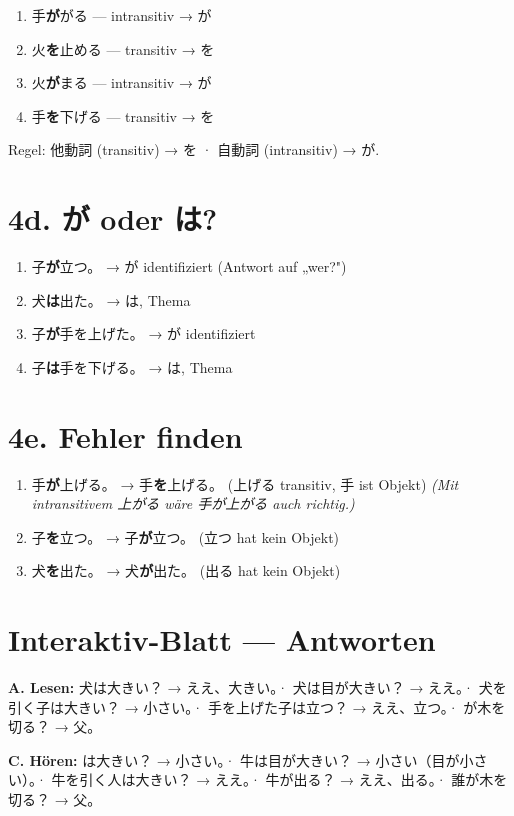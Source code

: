 \documentclass[11pt,a4paper,DIV=12]{scrartcl}
\begin{document}
\begin{enumerate}[itemsep=3pt]
\item 手\textbf{が}がる — intransitiv → が
\item 火\textbf{を}止める — transitiv → を
\item 火\textbf{が}まる — intransitiv → が
\item 手\textbf{を}下げる — transitiv → を
\end{enumerate}

Regel: 他動詞 (transitiv) → を · 自動詞 (intransitiv) → が.

\section{4d. が oder は?}

\begin{enumerate}[itemsep=3pt]
\item 子\textbf{が}立つ。 → が identifiziert (Antwort auf „wer?")
\item 犬\textbf{は}出た。 → は, Thema
\item 子\textbf{が}手を上げた。 → が identifiziert
\item 子\textbf{は}手を下げる。 → は, Thema
\end{enumerate}

\section{4e. Fehler finden}

\begin{enumerate}[itemsep=3pt]
\item 手\textbf{が}上げる。 → 手\textbf{を}上げる。 (上げる transitiv, 手 ist Objekt)
  \emph{(Mit intransitivem 上がる wäre 手が上がる auch richtig.)}
\item 子\textbf{を}立つ。 → 子\textbf{が}立つ。 (立つ hat kein Objekt)
\item 犬\textbf{を}出た。 → 犬\textbf{が}出た。 (出る hat kein Objekt)
\end{enumerate}

\section*{Interaktiv-Blatt — Antworten}

\textbf{A. Lesen:}
犬は大きい？ → ええ、大きい。\quad ·\quad
犬は目が大きい？ → ええ。\quad ·\quad
犬を引く子は大きい？ → 小さい。\quad ·\quad
手を上げた子は立つ？ → ええ、立つ。\quad ·\quad
{}が木を切る？ → 父。

\textbf{C. Hören:}
は大きい？ → 小さい。\quad ·\quad
牛は目が大きい？ → 小さい（目が小さい）。\quad ·\quad
牛を引く人は大きい？ → ええ。\quad ·\quad
牛が出る？ → ええ、出る。\quad ·\quad
誰が木を切る？ → 父。
\end{document}

